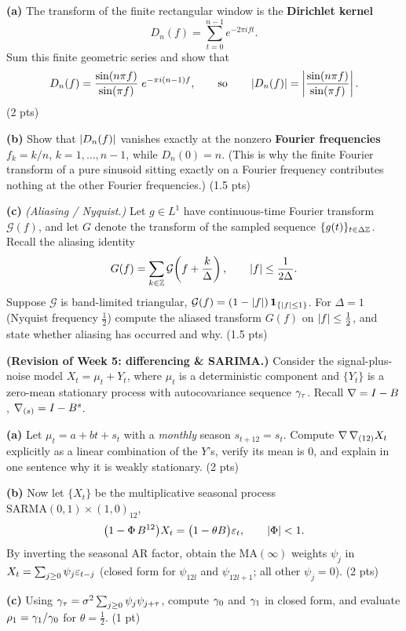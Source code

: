 \documentclass[11pt]{article}
\begin{document}
\textbf{(a)} The transform of the finite rectangular window is the \textbf{Dirichlet kernel}
\[
D_n(f)=\sum_{t=0}^{n-1} e^{-2\pi i f t}.
\]
Sum this finite geometric series and show that
\[
D_n(f)=\frac{\sin(n\pi f)}{\sin(\pi f)}\;e^{-\pi i (n-1) f},
\qquad\text{so}\qquad
\left\lvert D_n(f) \right\rvert=\left\lvert\frac{\sin(n\pi f)}{\sin(\pi f)}\right\rvert .
\]
\hfill(2 pts)

\textbf{(b)} Show that $\left\lvert D_n(f) \right\rvert$ vanishes exactly at the nonzero \textbf{Fourier frequencies} $f_k=k/n$, $k=1,\dots,n-1$, while $D_n(0)=n$. (This is why the finite Fourier transform of a pure sinusoid sitting exactly on a Fourier frequency contributes nothing at the other Fourier frequencies.) \hfill(1.5 pts)

\textbf{(c)} \emph{(Aliasing / Nyquist.)} Let $g\in L^1$ have continuous-time Fourier transform $\mathcal G(f)$, and let $G$ denote the transform of the sampled sequence $\{g(t)\}_{t\in\Delta\mathbb{Z}}$. Recall the aliasing identity
\[
G(f)=\sum_{k\in\mathbb{Z}}\mathcal G\!\left(f+\frac{k}{\Delta}\right),
\qquad \left\lvert f \right\rvert\le \frac{1}{2\Delta}.
\]
Suppose $\mathcal G$ is band-limited triangular,
$\mathcal G(f)=(1-\left\lvert f \right\rvert)\,\mathbf{1}_{\{\left\lvert f \right\rvert\le 1\}}$.
For $\Delta=1$ (Nyquist frequency $\tfrac12$) compute the aliased transform $G(f)$ on $\left\lvert f \right\rvert\le\tfrac12$, and state whether aliasing has occurred and why. \hfill(1.5 pts)
\answerpage

\textbf{(Revision of Week 5: differencing \& SARIMA.)} Consider the signal-plus-noise model $X_t=\mu_t+Y_t$, where $\mu_t$ is a deterministic component and $\{Y_t\}$ is a zero-mean stationary process with autocovariance sequence $\gamma_\tau$. Recall $\nabla=I-B$, $\nabla_{(s)}=I-B^{s}$.

\textbf{(a)} Let $\mu_t=a+bt+s_t$ with a \emph{monthly} season $s_{t+12}=s_t$. Compute $\nabla\,\nabla_{(12)}X_t$ explicitly as a linear combination of the $Y$'s, verify its mean is $0$, and explain in one sentence why it is weakly stationary. \hfill(2 pts)

\textbf{(b)} Now let $\{X_t\}$ be the multiplicative seasonal process $\mathrm{SARMA}(0,1)\times(1,0)_{12}$,
\[
\bigl(1-\Phi\,B^{12}\bigr)X_t=\bigl(1-\theta B\bigr)\varepsilon_t,
\qquad \left\lvert \Phi \right\rvert<1 .
\]
By inverting the seasonal AR factor, obtain the $\mathrm{MA}(\infty)$ weights $\psi_j$ in $X_t=\sum_{j\ge0}\psi_j\varepsilon_{t-j}$ (closed form for $\psi_{12l}$ and $\psi_{12l+1}$; all other $\psi_j=0$). \hfill(2 pts)

\textbf{(c)} Using $\gamma_\tau=\sigma^{2}\sum_{j\ge0}\psi_j\psi_{j+\tau}$, compute $\gamma_0$ and $\gamma_1$ in closed form, and evaluate $\rho_1=\gamma_1/\gamma_0$ for $\theta=\tfrac12$. \hfill(1 pt)
\answerpage
\end{document}
